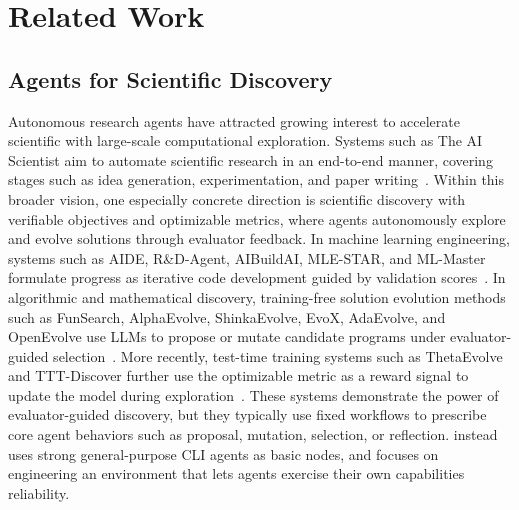 \documentclass{article} %
\begin{document}
   

   \section{Related Work}
   
   \subsection{Agents for Scientific Discovery}
   
   Autonomous research agents have attracted growing interest 
   to accelerate scientific with large-scale computational exploration.
   Systems such as The AI Scientist aim to automate scientific research in an end-to-end manner, covering stages such as idea generation, experimentation, and paper
     writing~\citep{aiscientist}.
   Within this broader vision, one especially concrete direction is scientific discovery with verifiable objectives and optimizable metrics, where agents
   autonomously explore and evolve solutions through evaluator feedback.
   In machine learning engineering, systems such as AIDE, R\&D-Agent, AIBuildAI, MLE-STAR, and ML-Master formulate progress as iterative code development guided by
   validation scores~\citep{aide,rdagent,aibuildai,mle_star,mlmaster}.
   In algorithmic and mathematical discovery, training-free solution evolution methods such as FunSearch, AlphaEvolve, ShinkaEvolve, EvoX, AdaEvolve, and OpenEvolve use LLMs to propose or mutate candidate programs under evaluator-guided
   selection~\citep{funsearch,alphaevolve,shinkaevolve,evox,adaevolve,openevolve}.
   More recently, test-time training systems such as ThetaEvolve and TTT-Discover further use the optimizable metric as a reward signal to update the model during 
   exploration~\citep{thetaevolve,tttdiscover}.
   These systems demonstrate the power of evaluator-guided discovery, but they typically use fixed workflows to prescribe core agent behaviors such as proposal, mutation, selection, or reflection.
   \method instead uses strong general-purpose CLI agents as basic nodes, and focuses on engineering an environment that lets agents exercise their own capabilities
   reliability.
   
   
\end{document}
